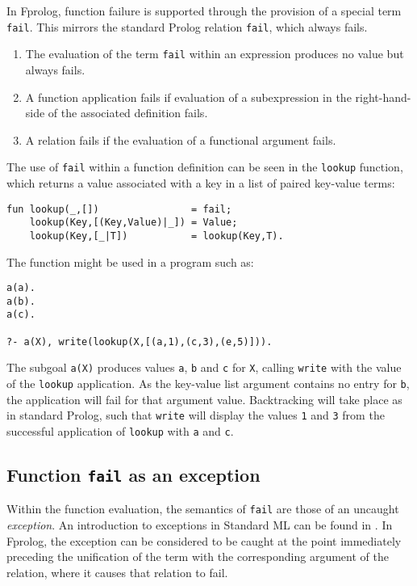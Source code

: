 \documentclass[a4paper,11pt,twoside]{article}
\begin{document}
In Fprolog, function failure is supported through the provision of a
special term \texttt{fail}.
This mirrors the standard Prolog relation \texttt{fail}, which
always fails.
\begin{enumerate}
\item{The evaluation of the term \texttt{fail} within an expression
  produces no value but always fails.}
\item{A function application fails if evaluation of a subexpression
  in the right-hand-side of the associated definition fails.}
\item{A relation fails if the evaluation of a functional argument
  fails.}
\end{enumerate}
The use of \texttt{fail} within a function definition can be seen
in the \texttt{lookup} function, which returns a value associated
with a key in a list of paired key-value terms:
\begin{verbatim}
fun lookup(_,[])                = fail;
    lookup(Key,[(Key,Value)|_]) = Value;
    lookup(Key,[_|T])           = lookup(Key,T).
\end{verbatim}
The function might be used in a program such as:
\begin{verbatim}
a(a).
a(b).
a(c).

?- a(X), write(lookup(X,[(a,1),(c,3),(e,5)])).
\end{verbatim}
The subgoal \texttt{a(X)} produces values \texttt{a},
\texttt{b} and \texttt{c} for \texttt{X}, calling \texttt{write}
with the value of the \texttt{lookup} application.  As the
key-value list argument contains no entry for \texttt{b}, the
application will fail for that argument value.  Backtracking will
take place as in standard Prolog, such that \texttt{write} will
display the values \texttt{1} and \texttt{3} from the successful
application of \texttt{lookup} with \texttt{a} and \texttt{c}.

\subsection{Function \texttt{fail} as an exception}

Within the function evaluation, the semantics of \texttt{fail} are
those of an uncaught \textit{exception}.  An introduction to exceptions in
Standard ML can be found in \cite{Pau91}.
In Fprolog, the exception can be considered to be caught at the point
immediately preceding the unification of the term with the
corresponding argument of the relation, where it causes that relation
to fail.
\end{document}
